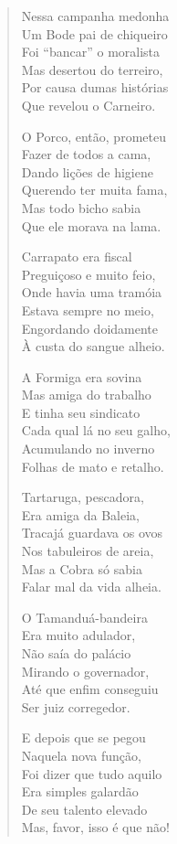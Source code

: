 \begin{verse}
Nessa campanha medonha\\
Um Bode pai de chiqueiro\\
Foi “bancar” o moralista\\
Mas desertou do terreiro,\\
Por causa dumas histórias\\
Que revelou o Carneiro.

O Porco, então, prometeu\\
Fazer de todos a cama,\\
Dando lições de higiene\\
Querendo ter muita fama,\\
Mas todo bicho sabia\\
Que ele morava na lama.

Carrapato era fiscal\\
Preguiçoso e muito feio,\\
Onde havia uma tramóia\\
Estava sempre no meio,\\
Engordando doidamente\\
À custa do sangue alheio.

A Formiga era sovina\\
Mas amiga do trabalho\\
E tinha seu sindicato\\
Cada qual lá no seu galho,\\
Acumulando no inverno\\
Folhas de mato e retalho.
\pagebreak

Tartaruga, pescadora,\\
Era amiga da Baleia,\\
Tracajá guardava os ovos\\
Nos tabuleiros de areia,\\
Mas a Cobra só sabia\\
Falar mal da vida alheia.

O Tamanduá-bandeira\\
Era muito adulador,\\
Não saía do palácio\\
Mirando o governador,\\
Até que enfim conseguiu\\
Ser juiz corregedor.

E depois que se pegou\\
Naquela nova função,\\
Foi dizer que tudo aquilo\\
Era simples galardão\\
De seu talento elevado\\
Mas, favor, isso é que não!


\end{verse}
